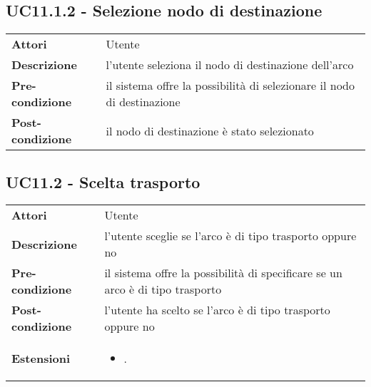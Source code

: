 \subsection{UC11.1.2 - Selezione nodo di destinazione}
\label{sssec:UC11.1.2}
\def\arraystretch{1.5}
\begin{tabularx}{\textwidth}{l|p{}}
\rowcolor{I} \multicolumn{2}{c}{\color{white}\textbf{UC11.1.2 - Selezione nodo di destinazione}} \\
\toprule
\endhead
\textbf{Attori} & Utente\\
\textbf{Descrizione} & l'utente seleziona il nodo di destinazione dell'arco\\
\textbf{Pre-condizione} & il sistema offre la possibilità di selezionare il nodo di destinazione\\
\textbf{Post-condizione} & il nodo di destinazione è stato selezionato\\
\bottomrule
\end{tabularx}
\subsection{UC11.2 - Scelta trasporto}
\label{sssec:UC11.2}
\def\arraystretch{1.5}
\begin{tabularx}{\textwidth}{l|p{}}
\rowcolor{I} \multicolumn{2}{c}{\color{white}\textbf{UC11.2 - Scelta trasporto}} \\
\toprule
\endhead
\textbf{Attori} & Utente\\
\textbf{Descrizione} & l'utente sceglie se l'arco è di tipo trasporto oppure no\\
\textbf{Pre-condizione} & il sistema offre la possibilità di specificare se un arco è di tipo trasporto\\
\textbf{Post-condizione} & l'utente ha scelto se l'arco è di tipo trasporto oppure no\\
\textbf{Estensioni} & \vspace{-1.2em}\begin{itemize}[leftmargin=*,noitemsep,nosep]
\item \nameref{sssec:UC11.4}.
\end{itemize}\\
\bottomrule
\end{tabularx}
